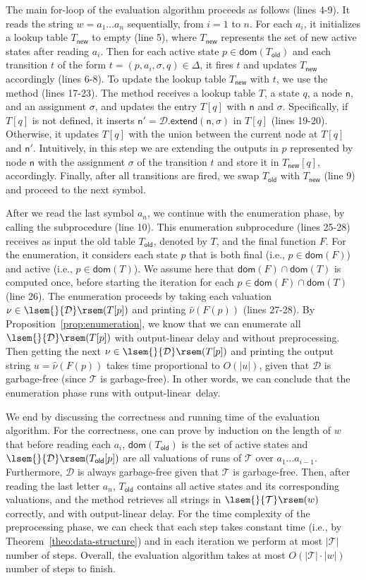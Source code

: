 \documentclass[
a4paper
]{article}
\theoremstyle{plain}
\theoremstyle{definition}
\theoremstyle{remark}
\newcommand{\dom}{\operatorname{dom}}
\newcommand{\nsst}{\mathcal{T}}
\newcommand{\D}{\mathcal{D}}
\newcommand{\n}{\textsf{n}}
\newcommand{\dextend}{\operatorname{extend}}
\newcommand{\Told}{T_{\operatorname{old}}}
\newcommand{\Tnew}{T_{\operatorname{new}}}
\newcommand{\sem}[1]{{\lsem{}{#1}\rsem}}
\renewcommand{\operatorname}[1]{\textsf{#1}}
\begin{document}
The main for-loop of the evaluation algorithm proceeds as follows (lines 4-9). It reads the string $w =a_1 \ldots a_n$ sequentially, from $i =1$ to $n$. 
For each $a_i$, it initializes a lookup table $\Tnew$ to empty (line 5), where $\Tnew$ represents the set of new active states after reading $a_i$.
Then for each active state $p \in \dom(\Told)$ and each transition $t$ of the form $t = (p, a_i, \sigma, q) \in \Delta$, it fires $t$ and updates $\Tnew$ accordingly (lines 6-8). To update the lookup table $\Tnew$ with $t$, we use the method  (lines 17-23). The method receives a lookup table $T$, a state $q$, a node $\n$, and an assignment $\sigma$, and updates the entry $T[q]$ with $\n$ and $\sigma$. Specifically, if $T[q]$ is not defined, it inserts $\n' = \D.\dextend(\n,\sigma)$ in $T[q]$ (lines 19-20). Otherwise, it updates $T[q]$ with the union between the current node at $T[q]$ and $\n'$. Intuitively, in this step we are extending the outputs in $p$ represented by node $\n$ with the assignment $\sigma$ of the transition $t$ and store it in $\Tnew[q]$, accordingly.
Finally, after all transitions are fired, we swap $\Told$ with $\Tnew$ (line 9) and proceed to the next symbol. 

After we read the last symbol $a_n$, we continue with the enumeration phase, by calling the subprocedure  (line 10). This enumeration subprocedure (lines 25-28) receives as input the old table $\Told$, denoted by $T$, and the final function $F$.
For the enumeration, it considers each state $p$ that is both final (i.e., $p \in \dom(F)$) and active (i.e., $p\in \dom(T)$). We assume here that $\dom(F) \cap \dom(T)$ is computed once, before starting the iteration for each $p \in \dom(F) \cap \dom(T)$ (line 26). 
The enumeration proceeds by taking each valuation $\nu \in \sem{\D}(T[p])$ and printing $\hat{\nu}(F(p))$ (lines 27-28). By Proposition~\ref{prop:enumeration}, we know that we can enumerate all $\sem{\D}(T[p])$ with output-linear delay and without preprocessing. Then getting the next $\nu \in \sem{\D}(T[p])$ and printing the output string $u = \hat{\nu}(F(p))$ takes time proportional to $O(|u|)$, given that $\D$ is garbage-free (since $\nsst$ is garbage-free). In other words, we can conclude that the enumeration phase runs with output-linear~delay.

We end by discussing the correctness and running time of the evaluation algorithm. For the correctness, one can prove by induction on the length of $w$ that before reading each $a_i$, $\dom(\Told)$ is the set of active states and $\sem{\D}(\Told[p])$ are all valuations of  runs of $\nsst$ over $a_1 \ldots a_{i-1}$. Furthermore, $\D$ is always garbage-free given that $\nsst$ is garbage-free. Then, after reading the last letter $a_n$, $\Told$ contains all active states and its corresponding valuations, and the method  retrieves all strings in $\sem{\nsst}(w)$ correctly, and with output-linear delay. For the time complexity of the preprocessing phase, we can check that each step takes constant time (i.e., by Theorem~\ref{theo:data-structure}) and in each iteration we perform at most $|\nsst|$ number of steps. Overall, the evaluation algorithm takes at most  $O(|\nsst|\cdot |w|)$ number of steps to finish. 
\end{document}
